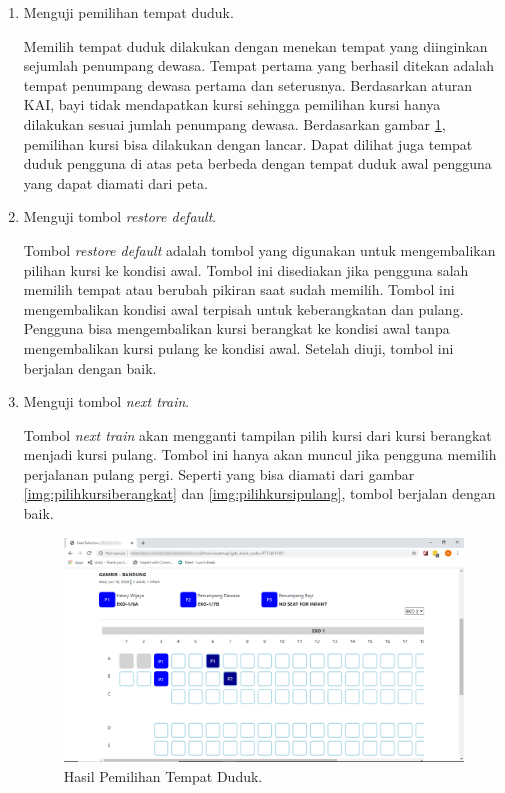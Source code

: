 \begin{enumerate}
        \item Menguji pemilihan tempat duduk.
        
        Memilih tempat duduk dilakukan dengan menekan tempat yang diinginkan sejumlah penumpang dewasa. Tempat pertama yang berhasil ditekan adalah tempat penumpang dewasa pertama dan seterusnya. Berdasarkan aturan KAI, bayi tidak mendapatkan kursi sehingga pemilihan kursi hanya dilakukan sesuai jumlah penumpang dewasa. Berdasarkan gambar \ref{img:pilihtempatduduk}, pemilihan kursi bisa dilakukan dengan lancar. Dapat dilihat juga tempat duduk pengguna di atas peta berbeda dengan tempat duduk awal pengguna yang dapat diamati dari peta.
        
         \item Menguji tombol \textit{restore default}.
        
        Tombol \textit{restore default} adalah tombol yang digunakan untuk mengembalikan pilihan kursi ke kondisi awal. Tombol ini disediakan jika pengguna salah memilih tempat atau berubah pikiran saat sudah memilih. Tombol ini mengembalikan kondisi awal terpisah untuk keberangkatan dan pulang. Pengguna bisa mengembalikan kursi berangkat ke kondisi awal tanpa mengembalikan kursi pulang ke kondisi awal. Setelah diuji, tombol ini berjalan dengan baik.
        
         \item Menguji tombol \textit{next train}.
        
        Tombol \textit{next train} akan mengganti tampilan pilih kursi dari kursi berangkat menjadi kursi pulang. Tombol ini hanya akan muncul jika pengguna memilih perjalanan pulang pergi. Seperti yang bisa diamati dari gambar \ref{img:pilihkursiberangkat} dan \ref{img:pilihkursipulang}, tombol berjalan dengan baik.
        
        \begin{figure}[H]
        \center
        \includegraphics[width=\textwidth,height=\textheight,keepaspectratio]{Gambar/Pilih Tempat Duduk.png}
        \caption{Hasil Pemilihan Tempat Duduk.}
            \label{img:pilihtempatduduk}
        \end{figure}
        

\end{enumerate}
